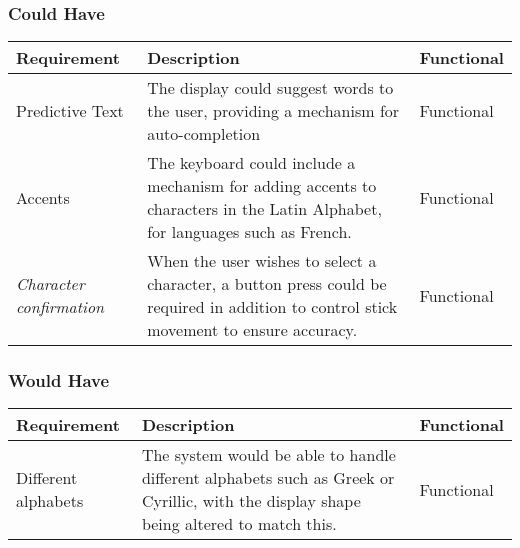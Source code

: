 \documentclass[requirements.tex]{subfiles}
\begin{document}
\subsubsection{Could Have} %
\label{ssub:after_could_have}
\begin{table}[H]
\scriptsize
\begin{tabularx}{\textwidth}{| l | X | l |}
 \hline
 \textbf{Requirement} & \textbf{Description} & \textbf{Functional} \\
 \hline
 Predictive Text & The display could suggest words to the user, providing a
 mechanism for auto-completion & Functional \\
 \hline
 Accents & The keyboard could include a mechanism for adding accents to
 characters in the Latin Alphabet, for languages such as French. & Functional \\
 \hline
 \emph{Character confirmation} & When the user wishes to select a character, a
 button press could be required in addition to control stick movement to ensure
 accuracy. & Functional \\
 \hline
\end{tabularx}
\end{table}

\subsubsection{Would Have} %
\label{ssub:after_would_have}
\begin{table}[H]
\scriptsize
\begin{tabularx}{\textwidth}{| l | X | l |}
 \hline
 \textbf{Requirement} & \textbf{Description} & \textbf{Functional} \\
 \hline
 Different alphabets & The system would be able to handle different alphabets
 such as Greek or Cyrillic, with the display shape being altered to match this.
 & Functional \\
 \hline
\end{tabularx}
\end{table}
\end{document}
